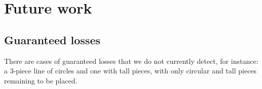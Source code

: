\section{Future work}\label{future work}

\subsection{Guaranteed losses}
There are cases of guaranteed losses that we do not currently detect, for instance: a 3-piece line of circles and one with tall pieces, with only circular and tall pieces remaining to be placed.